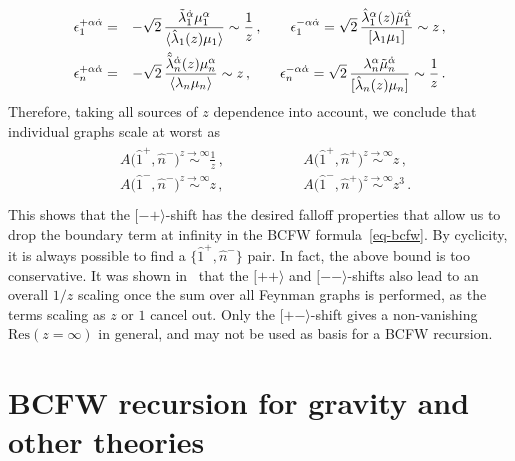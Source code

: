 \begin{eqnarray}
\epsilon_{1}^{+ \alpha \dot{\alpha}} &=& - \sqrt{2} \, \frac{ \tilde{\lambda}_{1}^{\dot\alpha} \mu_{1}^{\alpha}}{ \vev{ \hat{\lambda}_{1}(z) \mu_{1}}}  \sim \frac{1}{z} \,, \qquad 
\epsilon_{1}^{- \alpha \dot{\alpha}} = \sqrt{2} \, \frac{ {\hat{\lambda}_{1}}^{\alpha}(z) \tilde\mu_{1}^{\dot\alpha}}{ \lbrack \lambda_{1} \mu_{1} \rbrack } \sim z \,,  \\
%
%
\epsilon_{n}^{+ \alpha \dot{\alpha}} &=& - \sqrt{2} \, \frac{ 
\hat{\tilde{\lambda}}_{n}^{\dot\alpha}(z)
 \mu_{n}^{\alpha}}{ \vev{ \lambda_{n} \mu_{n}}}  \sim z \,, \qquad 
\epsilon_{n}^{- \alpha \dot{\alpha}} = \sqrt{2} \, \frac{ {\lambda}_{n}^{\alpha} \tilde\mu_{n}^{\dot\alpha}}{ \lbrack \hat{\lambda}_{n}(z) \mu_{n} \rbrack } \sim \frac{1}{z} \,.
\end{eqnarray}
Therefore, taking all sources of $z$ dependence into account, 
we conclude that individual graphs scale at worst as
\begin{align}
\label{zshiftscaling}
\begin{alignedat}{2}
& A\bigl( \hat{1}^{+}, \hat{n}^{-}\bigr) \stackrel{z\to \infty }{\sim} \frac{1}{z} \,, \qquad \qquad && A\bigl( \hat{1}^{+}, \hat{n}^{+} \bigr) \stackrel{z\to \infty }{\sim} z\,,\\
& A\bigl( \hat{1}^{-}, \hat{n}^{-}\bigr) \stackrel{z\to \infty }{\sim} z \,, \qquad \qquad  && A\bigl( \hat{1}^{-},\hat{n}^{+} \bigr) \stackrel{z\to \infty }{\sim} z^3\,. \\
\end{alignedat}
\end{align}
This shows that the $[-+\rangle$-shift has the desired falloff properties that allow us to drop the boundary term
at infinity in the BCFW formula~\eqref{eq-bcfw}. By cyclicity, it is always possible to find a $\{ \hat{1}^{+} , \hat{n}^{-} \}$ 
pair.
In fact, the above bound is too conservative. It was shown in~\cite{ch2_Arkani-Hamed:2008bsc}
that the $[++\rangle$ and $[--\rangle$-shifts also lead to an overall ${1}/{z}$ scaling once the sum over all Feynman graphs is performed, as the terms scaling as $z$ or $1$ cancel out.
Only the $[+-\rangle$-shift gives a non-vanishing $\text{Res}(z={\infty})$ in general, and may not be used as basis for a BCFW recursion.


\section{BCFW recursion for gravity and other theories}


